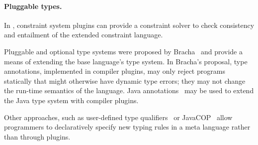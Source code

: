 \paragraph{Pluggable types.}

In \Xten{}, constraint system plugins can provide a constraint
solver to check consistency and entailment of the extended
constraint language.

Pluggable and optional type systems were proposed by
Bracha~\cite{bracha04-pluggable} and provide a means of
extending the base language's type system.
In Bracha's proposal, type annotations, implemented in compiler plugins,
may only reject programs statically that might otherwise have dynamic
type errors; they may not change the run-time semantics of the
language.
Java annotations~\cite{Java3,jsr308}
may be used to extend the Java type system with compiler plugins.

Other approaches, such as user-defined type
qualifiers~\cite{foster-popl02,chin05-qualifiers}
or JavaCOP~\cite{javacop-oopsla06}
allow programmers to 
declaratively specify new typing rules in a meta language rather
than through plugins.


